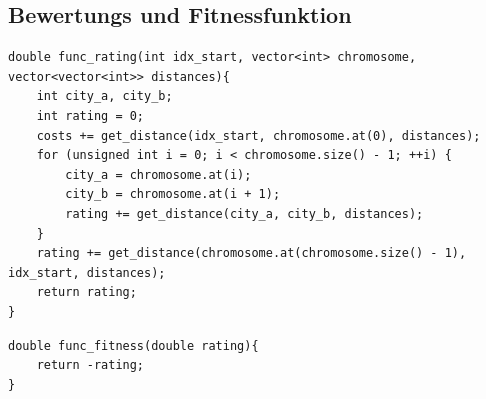 \subsection{Bewertungs und Fitnessfunktion}
\begin{minipage}{\linewidth}
\begin{lstlisting}[caption={Beispiel einer Ratingfunktion}, firstnumber=1, captionpos=b, label=lst:rating]
double func_rating(int idx_start, vector<int> chromosome, vector<vector<int>> distances){
	int city_a, city_b;
	int rating = 0;
	costs += get_distance(idx_start, chromosome.at(0), distances);
	for (unsigned int i = 0; i < chromosome.size() - 1; ++i) {
		city_a = chromosome.at(i);
		city_b = chromosome.at(i + 1);
		rating += get_distance(city_a, city_b, distances);
	}
	rating += get_distance(chromosome.at(chromosome.size() - 1), idx_start, distances);
	return rating;
}
\end{lstlisting}
\end{minipage}
\begin{minipage}{\linewidth}
\begin{lstlisting}[caption={Beispiel einer Fitnessfunktion}, firstnumber=1, captionpos=b, label=lst:fitness]
double func_fitness(double rating){
	return -rating;
}
\end{lstlisting}
\end{minipage}
